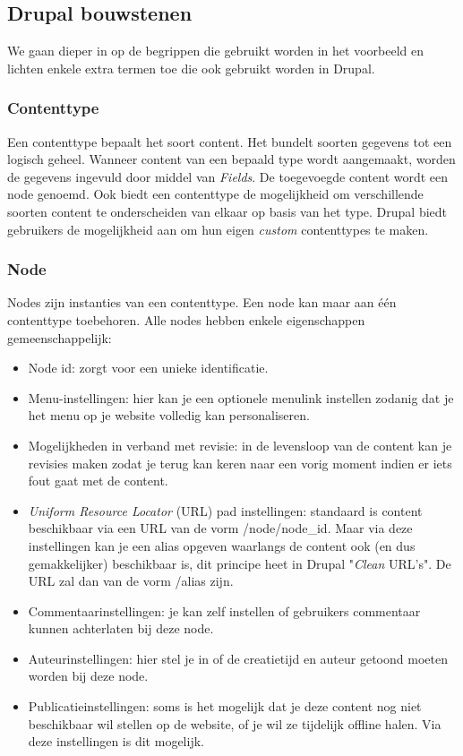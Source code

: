 \subsection{Drupal bouwstenen}

We gaan dieper in op de begrippen die gebruikt worden in het voorbeeld en lichten enkele extra termen toe die ook gebruikt worden in Drupal.

\subsubsection{Contenttype}
Een contenttype bepaalt het soort content. Het bundelt soorten gegevens tot een logisch geheel. Wanneer content van een bepaald type wordt aangemaakt, worden de gegevens ingevuld door middel van \textit{Fields}. De toegevoegde content wordt een node genoemd. Ook biedt een contenttype de mogelijkheid om verschillende soorten content te onderscheiden van elkaar op basis van het type.
Drupal biedt gebruikers de mogelijkheid aan om hun eigen \textit{custom} contenttypes te maken.

\subsubsection{Node}
Nodes zijn instanties van een contenttype. Een node kan maar aan \'{e}\'{e}n contenttype toebehoren.
Alle nodes hebben enkele eigenschappen gemeenschappelijk:
\begin{itemize}
\item Node id: zorgt voor een unieke identificatie.
\item Menu-instellingen: hier kan je een optionele menulink instellen zodanig dat je het menu op je website volledig kan personaliseren.
\item Mogelijkheden in verband met revisie: in de levensloop van de content kan je revisies maken zodat je terug kan keren naar een vorig moment indien er iets fout gaat met de content.
\item \textit{Uniform Resource Locator} (URL)  pad instellingen: standaard is content beschikbaar via een URL van de vorm /node/node\_id. Maar via deze instellingen kan je een alias opgeven waarlangs de content ook (en dus gemakkelijker) beschikbaar is, dit principe heet in Drupal "\textit{Clean} URL's". De URL zal dan van de vorm /alias zijn.
\item Commentaarinstellingen: je kan zelf instellen of gebruikers commentaar kunnen achterlaten bij deze node.
\item Auteurinstellingen: hier stel je in of de creatietijd en auteur getoond moeten worden bij deze node.
\item Publicatieinstellingen: soms is het mogelijk dat je deze content nog niet beschikbaar wil stellen op de website, of je wil ze tijdelijk offline halen. Via deze instellingen is dit mogelijk.
\end{itemize}

